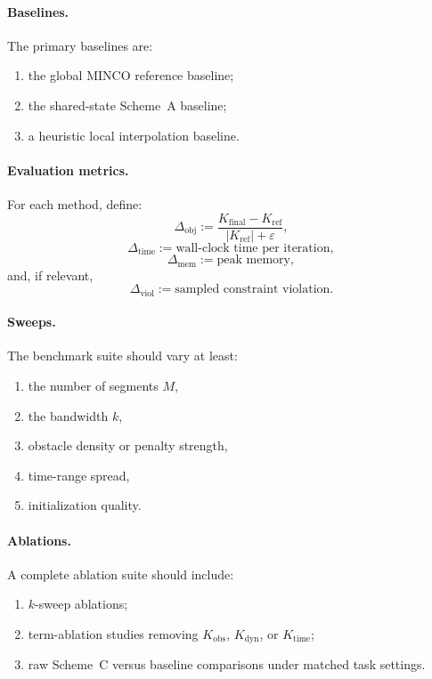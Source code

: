 \paragraph{Baselines.}
The primary baselines are:
\begin{enumerate}
    \item the global MINCO reference baseline;
    \item the shared-state Scheme~A baseline;
    \item a heuristic local interpolation baseline.
\end{enumerate}

\paragraph{Evaluation metrics.}
For each method, define:
\begin{equation}
\label{eq:phase10_metric_obj}
\Delta_{\mathrm{obj}}
:=
\frac{K_{\mathrm{final}}-K_{\mathrm{ref}}}{|K_{\mathrm{ref}}|+\varepsilon},
\end{equation}
\begin{equation}
\label{eq:phase10_metric_time}
\Delta_{\mathrm{time}}
:=
\text{wall-clock time per iteration},
\end{equation}
\begin{equation}
\label{eq:phase10_metric_mem}
\Delta_{\mathrm{mem}}
:=
\text{peak memory},
\end{equation}
and, if relevant,
\begin{equation}
\label{eq:phase10_metric_violation}
\Delta_{\mathrm{viol}}
:=
\text{sampled constraint violation}.
\end{equation}

\paragraph{Sweeps.}
The benchmark suite should vary at least:
\begin{enumerate}
    \item the number of segments \(M\),
    \item the bandwidth \(k\),
    \item obstacle density or penalty strength,
    \item time-range spread,
    \item initialization quality.
\end{enumerate}

\paragraph{Ablations.}
A complete ablation suite should include:
\begin{enumerate}
    \item \(k\)-sweep ablations;
    \item term-ablation studies removing \(K_{\mathrm{obs}}\), \(K_{\mathrm{dyn}}\), or \(K_{\mathrm{time}}\);
    \item raw Scheme~C versus baseline comparisons under matched task settings.
\end{enumerate}

